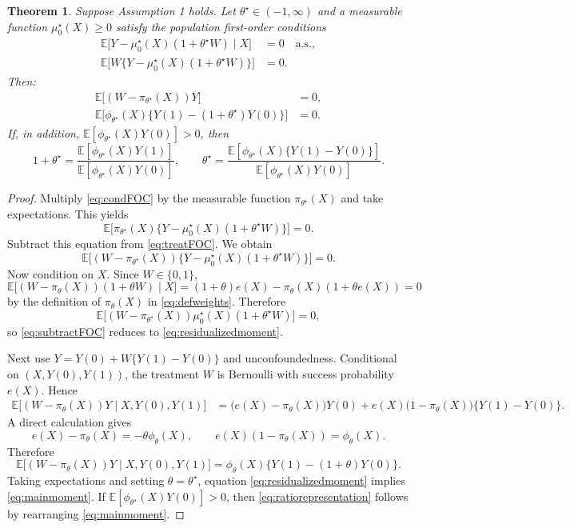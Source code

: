 \documentclass[11pt]{article}
\newtheorem{theorem}{Theorem}
\newcommand{\E}{\mathbb{E}}
\newcommand{\1}{\mathbf{1}}
\begin{document}
\begin{theorem}
\label{thm:main}
Suppose Assumption 1 holds. Let $\theta^\star\in(-1,\infty)$ and a measurable function $\mu_0^\star(X)\ge 0$ satisfy the population first-order conditions
\begin{align}
\E\big[Y-\mu_0^\star(X)(1+\theta^\star W)\mid X\big] &= 0 \quad \text{a.s.},
\label{eq:condFOC}
\\
\E\big[W\{Y-\mu_0^\star(X)(1+\theta^\star W)\}\big] &= 0.
\label{eq:treatFOC}
\end{align}
Then:
\begin{align}
\E\Big[(W-\pi_{\theta^\star}(X))Y\Big] &= 0,
\label{eq:residualizedmoment}
\\
\E\Big[\phi_{\theta^\star}(X)\{Y(1)-(1+\theta^\star)Y(0)\}\Big] &= 0.
\label{eq:mainmoment}
\end{align}
If, in addition, $\E[\phi_{\theta^\star}(X)Y(0)]>0$, then
\begin{equation}
1+\theta^\star
=
\frac{\E[\phi_{\theta^\star}(X)Y(1)]}{\E[\phi_{\theta^\star}(X)Y(0)]},
\qquad
\theta^\star
=
\frac{\E[\phi_{\theta^\star}(X)\{Y(1)-Y(0)\}]}{\E[\phi_{\theta^\star}(X)Y(0)]}.
\label{eq:ratiorepresentation}
\end{equation}
\end{theorem}

\begin{proof}
Multiply \eqref{eq:condFOC} by the measurable function $\pi_{\theta^\star}(X)$ and take expectations. This yields
\[
\E\Big[\pi_{\theta^\star}(X)\{Y-\mu_0^\star(X)(1+\theta^\star W)\}\Big]=0.
\]
Subtract this equation from \eqref{eq:treatFOC}. We obtain
\begin{equation}
\E\Big[(W-\pi_{\theta^\star}(X))\{Y-\mu_0^\star(X)(1+\theta^\star W)\}\Big]=0.
\label{eq:subtractFOC}
\end{equation}
Now condition on $X$. Since $W\in\{0,1\}$,
\[
\E\Big[(W-\pi_\theta(X))(1+\theta W)\mid X\Big]
=
(1+\theta)e(X)-\pi_\theta(X)(1+\theta e(X))
=0
\]
by the definition of $\pi_\theta(X)$ in \eqref{eq:defweights}. Therefore
\[
\E\Big[(W-\pi_{\theta^\star}(X))\mu_0^\star(X)(1+\theta^\star W)\Big]=0,
\]
so \eqref{eq:subtractFOC} reduces to \eqref{eq:residualizedmoment}.

Next use $Y=Y(0)+W\{Y(1)-Y(0)\}$ and unconfoundedness. Conditional on $(X,Y(0),Y(1))$, the treatment $W$ is Bernoulli with success probability $e(X)$. Hence
\begin{align*}
\E\Big[(W-\pi_\theta(X))Y\mid X,Y(0),Y(1)\Big]
&=
\big(e(X)-\pi_\theta(X)\big)Y(0)
+e(X)\big(1-\pi_\theta(X)\big)\{Y(1)-Y(0)\}.
\end{align*}
A direct calculation gives
\[
e(X)-\pi_\theta(X)=-\theta\phi_\theta(X),
\qquad
e(X)(1-\pi_\theta(X))=\phi_\theta(X).
\]
Therefore
\[
\E\Big[(W-\pi_\theta(X))Y\mid X,Y(0),Y(1)\Big]
=
\phi_\theta(X)\{Y(1)-(1+\theta)Y(0)\}.
\]
Taking expectations and setting $\theta=\theta^\star$, equation \eqref{eq:residualizedmoment} implies \eqref{eq:mainmoment}. If $\E[\phi_{\theta^\star}(X)Y(0)]>0$, then \eqref{eq:ratiorepresentation} follows by rearranging \eqref{eq:mainmoment}.
\end{proof}
\end{document}
